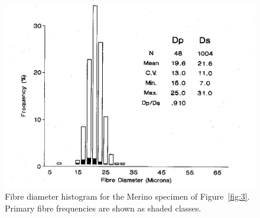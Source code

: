 %

\begin{figure}[h]
  \centering
  \includegraphics[width=\textwidth, trim = 0 0 0 120]{images/fig4.png}
  \caption{Fibre diameter histogram for the Merino specimen of
	   Figure~\ref{fig:3}.
	   Primary fibre frequencies are shown as shaded classes.}
  \label{fig:4}
\end{figure}

%

